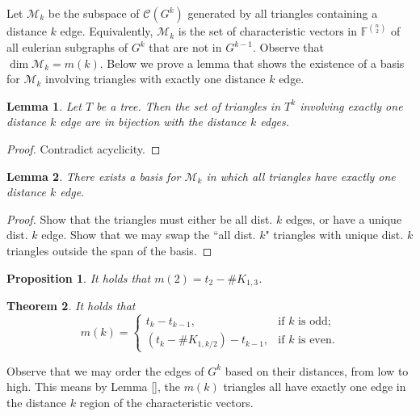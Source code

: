\documentclass[12pt]{article}
\newtheorem{thm}{Theorem}[section] %
\newtheorem{lem}{Lemma} %
\newtheorem{prop}[thm]{Proposition}
\theoremstyle{definition}
\begin{document}
Let $\mathcal{M}_k$ be the subspace of $\mathcal{C}(G^{k})$ generated by all triangles containing a distance $k$ edge.  Equivalently, $\mathcal{M}_k$ is the set of characteristic vectors in $\mathbb{F}^{n \choose 2}$ of all eulerian subgraphs of $G^k$ that are not in $G^{k-1}$.  Observe that $\dim\mathcal{M}_k = m(k)$.  Below we prove a lemma that shows the existence of a basis for $\mathcal{M}_k$ involving triangles with exactly one distance $k$ edge.

\begin{lem}
	Let $T$ be a tree.  Then the set of triangles in $T^k$ involving exactly one distance $k$ edge are in bijection with the distance $k$ edges.
\end{lem}
\begin{proof}
	Contradict acyclicity.
\end{proof}

\begin{lem}
	There exists a basis for $\mathcal{M}_k$ in which all triangles have exactly one distance $k$ edge.
\end{lem}
\begin{proof}
	Show that the triangles must either be all dist. $k$ edges, or have a unique dist. $k$ edge.  Show that we may swap the ``all dist. $k$" triangles with unique dist. $k$ triangles outside the span of the basis.
\end{proof}

\begin{prop}
	It holds that $m(2) = t_2 - \#K_{1,3}$.
\end{prop}

\begin{thm}
	It holds that 
	$$m(k) = \begin{cases}
		t_k - t_{k-1}, &\text{if $k$ is odd;}	\\
		(t_k - \#K_{1,k/2}) - t_{k-1}, &\text{if $k$ is even.}
	\end{cases}$$
\end{thm}



Observe that we may order the edges of $G^k$ based on their distances, from low to high.  This means by Lemma [], the $m(k)$ triangles all have exactly one edge in the distance $k$ region of the characteristic vectors.
\end{document}

